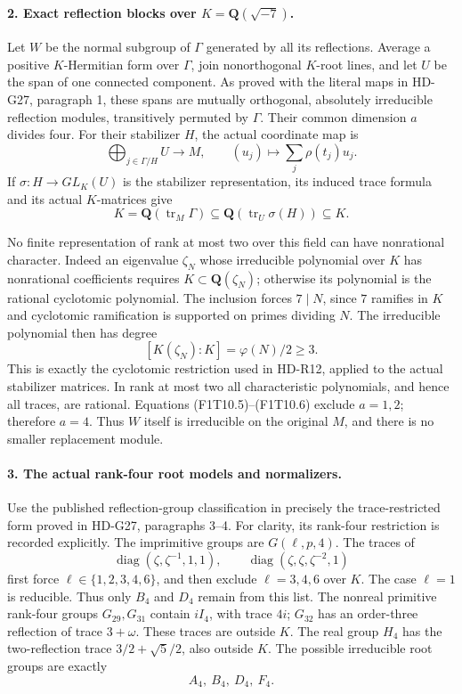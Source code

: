 \paragraph{2. Exact reflection blocks over \(K=\mathbf Q(\sqrt{-7})\).}
Let \(W\) be the normal subgroup of \(\Gamma\) generated by all
its reflections. Average a positive \(K\)-Hermitian form over
\(\Gamma\), join nonorthogonal \(K\)-root lines, and let \(U\)
be the span of one connected component. As proved with the
literal maps in HD-G27, paragraph 1, these spans are mutually
orthogonal, absolutely irreducible reflection modules, transitively
permuted by \(\Gamma\). Their common dimension \(a\) divides four.
For their stabilizer \(H\), the actual coordinate map is
\[
 \bigoplus_{j\in\Gamma/H}U\longrightarrow M,\qquad
       (u_j)\longmapsto\sum_j\rho(t_j)u_j .
 \tag{F1T10.4}
\]
If \(\sigma:H\to GL_K(U)\) is the stabilizer representation,
its induced trace formula and its actual \(K\)-matrices give
\[
 K=\mathbf Q(\operatorname{tr}_M\Gamma)
     \subseteq\mathbf Q(\operatorname{tr}_U\sigma(H))
     \subseteq K.
 \tag{F1T10.5}
\]

No finite representation of rank at most two over this field
can have nonrational character. Indeed an eigenvalue \(\zeta_N\)
whose irreducible polynomial over \(K\) has nonrational
coefficients requires
\(K\subset\mathbf Q(\zeta_N)\); otherwise its polynomial is
the rational cyclotomic polynomial. The inclusion forces
\(7\mid N\), since \(7\) ramifies in \(K\) and cyclotomic
ramification is supported on primes dividing \(N\). The
irreducible polynomial then has degree
\[
 [K(\zeta_N):K]=\varphi(N)/2\ge3.
 \tag{F1T10.6}
\]
This is exactly the cyclotomic restriction used in HD-R12,
applied to the actual stabilizer matrices. In rank at most two
all characteristic polynomials, and hence all traces, are
rational. Equations (F1T10.5)--(F1T10.6) exclude \(a=1,2\);
therefore \(a=4\). Thus \(W\) itself is irreducible on the
original \(M\), and there is no smaller replacement module.

\paragraph{3. The actual rank-four root models and normalizers.}
Use the published reflection-group classification in precisely
the trace-restricted form proved in HD-G27, paragraphs 3--4.
For clarity, its rank-four restriction is recorded explicitly.
The imprimitive groups are \(G(\ell,p,4)\). The traces of
\[
 \operatorname{diag}(\zeta,\zeta^{-1},1,1),\qquad
 \operatorname{diag}(\zeta,\zeta,\zeta^{-2},1)
 \tag{F1T10.7}
\]
first force \(\ell\in\{1,2,3,4,6\}\), and then exclude
\(\ell=3,4,6\) over \(K\). The case \(\ell=1\) is reducible.
Thus only \(B_4\) and \(D_4\) remain from this list.
The nonreal primitive rank-four groups \(G_{29},G_{31}\)
contain \(iI_4\), with trace \(4i\); \(G_{32}\) has an
order-three reflection of trace \(3+\omega\). These traces
are outside \(K\). The real group \(H_4\) has the two-reflection
trace \(3/2+\sqrt5/2\), also outside \(K\). The possible
irreducible root groups are exactly
\[
                         A_4,\ B_4,\ D_4,\ F_4.
 \tag{F1T10.8}
\]

